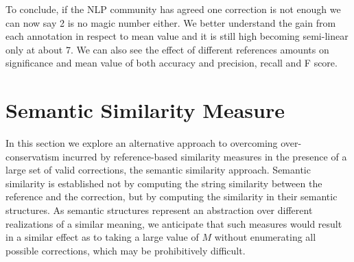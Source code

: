 		
		To conclude, if the NLP community has agreed one correction is not enough\cite{tetreault2008native}
		we can now say 2 is no magic number either. We better understand the gain from each annotation in respect to mean value and it is still high becoming semi-linear only at about 7. We can also see the effect of different references amounts on significance and mean value of both accuracy and precision, recall and F score.
		
		
		\section{Semantic Similarity Measure}\label{sec:Semantics}
		
		
		
		In this section we explore an alternative approach to overcoming over-conservatism
		incurred by reference-based similarity measures in the presence of a large set of
		valid corrections, the semantic similarity approach.
		Semantic similarity is established not by computing the string similarity between
		the reference and the correction, but by computing the similarity in their semantic
		structures. As semantic structures represent an abstraction over different realizations
		of a similar meaning, we anticipate that such measures would result in a similar
		effect as to taking a large value of $M$ without enumerating all possible corrections,
		which may be prohibitively difficult.
		
